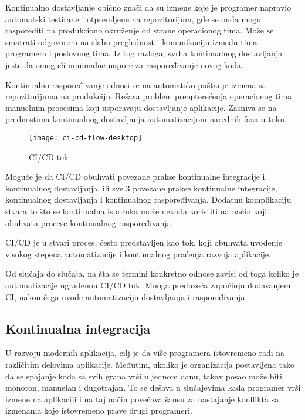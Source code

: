 Kontinualno dostavljanje obično znači da su izmene koje je programer napravio automatski testirane 
i otpremljene na repozitorijum, gde se onda mogu rasporediti na produkciono okruženje od strane 
operacionog tima. Može se smatrati odgovorom na slabu preglednost i komunikaciju između tima 
programera i poslovnog tima. Iz tog razloga, svrha kontinualnog dostavljanja jeste da omogući 
minimalne napore za raspoređivanje novog koda.

Kontinualno raspoređivanje odnosi se na automatsko puštanje izmena sa repozitorijuma na produkciju. 
Rešava problem preopterećenja operacionog tima manuelnim procesima koji usporavaju dostavljanje 
aplikacije. Zasniva se na prednostima kontinualnog dostavljanja automatizacijom narednih faza u toku.

\begin{figure}[h]
    \centering
    \texttt{[image: ci-cd-flow-desktop]}
    \caption{CI/CD tok}
\end{figure}

Moguće je da CI/CD obuhvati povezane prakse kontinualne integracije i kontinualnog dostavljanja, 
ili sve 3 povezane prakse kontinualne integracije, kontinualnog dostavljanja i kontinualnog 
raspoređivanja. Dodatnu komplikaciju stvara to što se kontinualna isporuka može nekada koristiti 
na način koji obuhvata procese kontinualnog raspoređivanja.

CI/CD je u stvari proces, često predstavljen kao tok, koji obuhvata uvođenje visokog stepena 
automatizacije i kontinualnog praćenja razvoja aplikacije.

Od slučaja do slučaja, na šta se termini konkretno odnose zavisi od toga koliko je automatizacije 
ugrađenou CI/CD tok. Mnoga preduzeća započinju dodavanjem CI, nakon čega uvode automatizaciju 
dostavljanja i raspoređivanja.

\subsection{Kontinualna integracija}
U razvoju modernih aplikacija, cilj je da više programera istovremeno radi na različitim delovima 
aplikacije. Međutim, ukoliko je organizacija postavljena tako da se spajanje koda sa svih grana 
vrši u jednom danu, takav posao može biti monoton, manuelan i dugotrajan. To se dešava u slučajevima 
kada programer vrši izmene na aplikaciji i na taj način povećava šansu za nastajanje konflikta sa 
izmenama koje istovremeno prave drugi programeri.

